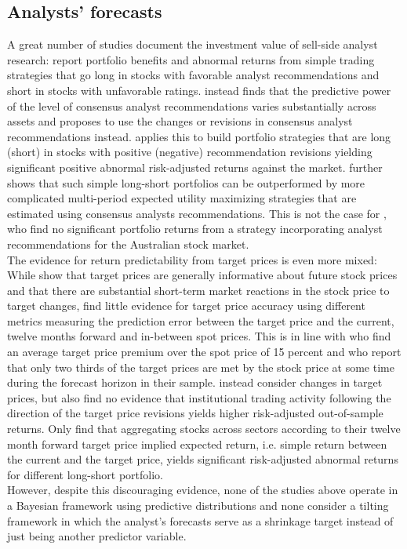\subsection{Analysts' forecasts}
\indent A great number of studies document the investment value of sell-side analyst research: \cite{barber2001,green2006} report portfolio benefits and abnormal returns from simple trading strategies that go long in stocks with favorable analyst recommendations and short in stocks with unfavorable ratings. \cite{jegadeesh2004} instead finds that the predictive power of the level of consensus analyst recommendations varies substantially across assets and proposes to use the changes or revisions in consensus analyst recommendations instead. \cite{jegadeesh2006} applies this to build portfolio strategies that are long (short) in stocks with positive (negative) recommendation revisions yielding significant positive abnormal risk-adjusted returns against the market. \cite{cvitanic2006} further shows that such simple long-short portfolios can be outperformed by more complicated multi-period expected utility maximizing strategies that are estimated using consensus analysts recommendations. This is not the case for \cite{he2013}, who find no significant portfolio returns from a \cite{black1992} strategy incorporating analyst recommendations for the Australian stock market.\\
%
\indent The evidence for return predictability from target prices is even more mixed: While \cite{brav2003} show that target prices are generally informative about future stock prices and that there are substantial short-term market reactions in the stock price to target changes, \cite{bonini2010} find little evidence for target price accuracy using different metrics measuring the prediction error between the target price and the current, twelve months forward and in-between spot prices. This is in line with \cite{bradshaw2012b} who find an average target price premium over the spot price of 15 percent and who report that only two thirds of the target prices are met by the stock price at some time during the forecast horizon in their sample. \cite{lin2016} instead consider changes in target prices, but also find no evidence that institutional trading activity following the direction of the target price revisions yields higher risk-adjusted out-of-sample returns. Only \cite{da2011} find that aggregating stocks across sectors according to their twelve month forward target price implied expected return, i.e. simple return between the current and the target price, yields significant risk-adjusted abnormal returns for different long-short portfolio.\\
%
\indent However, despite this discouraging evidence, none of the studies above operate in a Bayesian framework using predictive distributions and none consider a tilting framework in which the analyst's forecasts serve as a shrinkage target instead of just being another predictor variable.  

